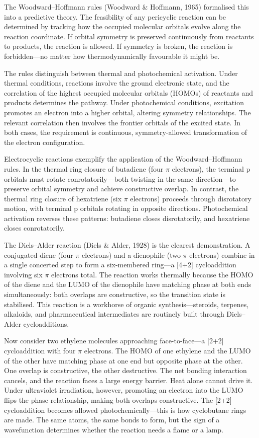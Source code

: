 The Woodward–Hoffmann rules (Woodward \& Hoffmann, 1965) formalised this into a predictive theory. The feasibility of any pericyclic reaction can be determined by tracking how the occupied molecular orbitals evolve along the reaction coordinate. If orbital symmetry is preserved continuously from reactants to products, the reaction is allowed. If symmetry is broken, the reaction is forbidden—no matter how thermodynamically favourable it might be.

The rules distinguish between thermal and photochemical activation. Under thermal conditions, reactions involve the ground electronic state, and the correlation of the highest occupied molecular orbitals (HOMOs) of reactants and products determines the pathway. Under photochemical conditions, excitation promotes an electron into a higher orbital, altering symmetry relationships. The relevant correlation then involves the frontier orbitals of the excited state. In both cases, the requirement is continuous, symmetry-allowed transformation of the electron configuration.

Electrocyclic reactions exemplify the application of the Woodward–Hoffmann rules. In the thermal ring closure of butadiene (four $\pi$ electrons), the terminal $\mathrm{p}$ orbitals must rotate conrotatorily—both twisting in the same direction—to preserve orbital symmetry and achieve constructive overlap. In contrast, the thermal ring closure of hexatriene (six $\pi$ electrons) proceeds through disrotatory motion, with terminal $\mathrm{p}$ orbitals rotating in opposite directions. Photochemical activation reverses these patterns: butadiene closes disrotatorily, and hexatriene closes conrotatorily.

The Diels–Alder reaction (Diels \& Alder, 1928) is the clearest demonstration. A conjugated diene (four $\pi$ electrons) and a dienophile (two $\pi$ electrons) combine in a single concerted step to form a six-membered ring—a [4+2] cycloaddition involving six $\pi$ electrons total. The reaction works thermally because the HOMO of the diene and the LUMO of the dienophile have matching phase at both ends simultaneously: both overlaps are constructive, so the transition state is stabilised. This reaction is a workhorse of organic synthesis—steroids, terpenes, alkaloids, and pharmaceutical intermediates are routinely built through Diels–Alder cycloadditions.

Now consider two ethylene molecules approaching face-to-face—a [2+2] cycloaddition with four $\pi$ electrons. The HOMO of one ethylene and the LUMO of the other have matching phase at one end but opposite phase at the other. One overlap is constructive, the other destructive. The net bonding interaction cancels, and the reaction faces a large energy barrier. Heat alone cannot drive it. Under ultraviolet irradiation, however, promoting an electron into the LUMO flips the phase relationship, making both overlaps constructive. The [2+2] cycloaddition becomes allowed photochemically—this is how cyclobutane rings are made. The same atoms, the same bonds to form, but the sign of a wavefunction determines whether the reaction needs a flame or a lamp.

